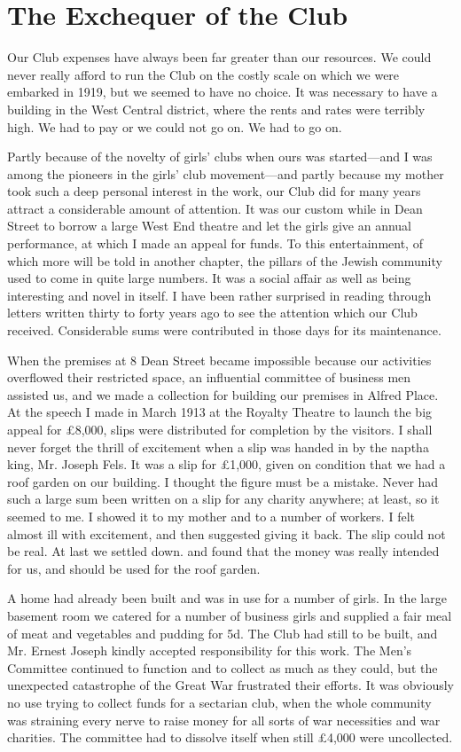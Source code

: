 \chapter{The Exchequer of the Club}

Our Club expenses have always been far greater than our
resources. We could never really afford to run the Club
on the costly scale on which we were embarked in 1919,
but we seemed to have no choice. It was necessary to
have a building in the West Central district, where the
rents and rates were terribly high. We had to pay or we
could not go on. We had to go on.

Partly because of the novelty of girls’ clubs when ours
was started—and I was among the pioneers in the girls’
club movement—and partly because my mother took such
a deep personal interest in the work, our Club did for
many years attract a considerable amount of attention.
It was our custom while in Dean Street to borrow a large
West End theatre and let the girls give an annual performance,
at which I made an appeal for funds. To this
entertainment, of which more will be told in another
chapter, the pillars of the Jewish community used to come
in quite large numbers. It was a social affair as well as
being interesting and novel in itself. I have been rather
surprised in reading through letters written thirty to forty
years ago to see the attention which our Club received.
Considerable sums were contributed in those days for its
maintenance.

When the premises at 8 Dean Street became impossible
because our activities overflowed their restricted space, an
influential committee of business men assisted us, and we
made a collection for building our premises in Alfred
Place. At the speech I made in March 1913 at the
Royalty Theatre to launch the big appeal for £8,000,
slips were distributed for completion by the visitors. I
shall never forget the thrill of excitement when a slip
was handed in by the naptha king, Mr. Joseph Fels. It
was a slip for £1,000, given on condition that we had a
roof garden on our building. I thought the figure must
be a mistake. Never had such a large sum been written
on a slip for any charity anywhere; at least, so it seemed
to me. I showed it to my mother and to a number of
workers. I felt almost ill with excitement, and then suggested
giving it back. The slip could not be real. At last
we settled down. and found that the money was really
intended for us, and should be used for the roof garden.

A home had already been built and was in use for a
number of girls. In the large basement room we catered
for a number of business girls and supplied a fair meal of
meat and vegetables and pudding for 5d. The Club had
still to be built, and Mr. Ernest Joseph kindly accepted
responsibility for this work. The Men’s Committee continued
to function and to collect as much as they could,
but the unexpected catastrophe of the Great War frustrated
their efforts. It was obviously no use trying to
collect funds for a sectarian club, when the whole community
was straining every nerve to raise money for all
sorts of war necessities and war charities. The committee
had to dissolve itself when still £4,000 were uncollected.

